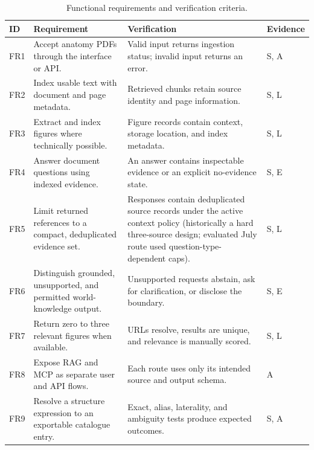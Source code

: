 {\scriptsize
\setlength{\tabcolsep}{3pt}
\renewcommand{\arraystretch}{1.00}
\begin{table}[htbp]
  \centering
  \caption{Functional requirements and verification criteria.}
  \label{tab:functional-requirements}
  \begin{tabularx}{\textwidth}{L{0.07\textwidth} Y Y L{0.11\textwidth}}
    \toprule
    ID & Requirement & Verification & Evidence \\
    \midrule
    FR1 &
    Accept anatomy PDFs through the interface or API. &
    Valid input returns ingestion status; invalid input returns an error. &
    S, A \\

    FR2 &
    Index usable text with document and page metadata. &
    Retrieved chunks retain source identity and page information. &
    S, L \\

    FR3 &
    Extract and index figures where technically possible. &
    Figure records contain context, storage location, and index metadata. &
    S, L \\

    FR4 &
    Answer document questions using indexed evidence. &
    An answer contains inspectable evidence or an explicit no-evidence state. &
    S, E \\

    FR5 &
    Limit returned references to a compact, deduplicated evidence set. &
    Responses contain deduplicated source records under the active context policy (historically a hard three-source design; evaluated July route used question-type-dependent caps). &
    S, L \\

    FR6 &
    Distinguish grounded, unsupported, and permitted world-knowledge output. &
    Unsupported requests abstain, ask for clarification, or disclose the boundary. &
    S, E \\

    FR7 &
    Return zero to three relevant figures when available. &
    URLs resolve, results are unique, and relevance is manually scored. &
    S, L \\

    FR8 &
    Expose RAG and MCP as separate user and API flows. &
    Each route uses only its intended source and output schema. &
    A \\

    FR9 &
    Resolve a structure expression to an exportable catalogue entry. &
    Exact, alias, laterality, and ambiguity tests produce expected outcomes. &
    S, A \\


\end{tabularx}
\end{table}}
